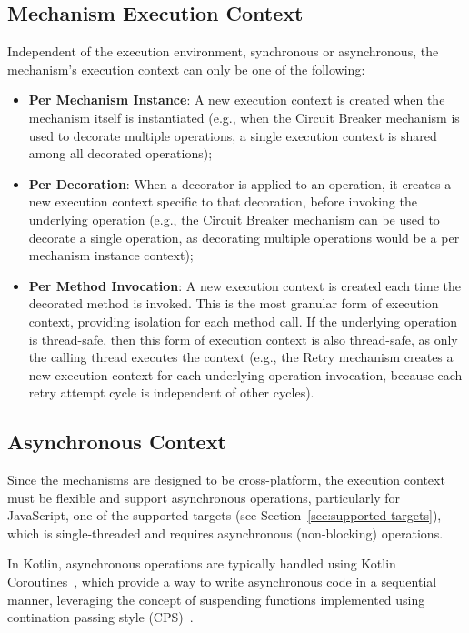 \subsection{Mechanism Execution Context}\label{subsec:mechanism-execution-context}

Independent of the execution environment, synchronous or asynchronous, the mechanism's execution context can only be one of the following:

\begin{itemize}
    \item \textbf{Per Mechanism Instance}: A new execution context is created when the mechanism itself is instantiated (e.g., when the Circuit Breaker mechanism is used to decorate multiple operations, a single execution context is shared among all decorated operations);
    \item \textbf{Per Decoration}: When a decorator is applied to an operation, it creates a new execution context specific to that decoration, before invoking the underlying operation (e.g., the Circuit Breaker mechanism can be used to decorate a single operation, as decorating multiple operations would be a per mechanism instance context);
    \item \textbf{Per Method Invocation}: A new execution context is created each time the decorated method is invoked.
    This is the most granular form of execution context, providing isolation for each method call.
    If the underlying operation is thread-safe, then this form of execution context is also thread-safe,
    as only the calling thread executes the context
    (e.g., the Retry mechanism creates a new execution context for each underlying operation invocation,
    because each retry attempt cycle is independent of other cycles).
\end{itemize}

\subsection{Asynchronous Context}\label{subsec:asynchronous-context}

Since the mechanisms are designed to be cross-platform, the execution context must be flexible and support asynchronous operations, particularly for JavaScript, one of the supported targets (see Section~\ref{sec:supported-targets}), which is single-threaded and requires asynchronous (non-blocking) operations.

In Kotlin, asynchronous operations are typically handled using Kotlin Coroutines~\cite{kotlin-coroutines},
which provide a way to write asynchronous code in a sequential manner,
leveraging the concept of suspending functions implemented using contination passing style (CPS)~\cite{continuation-passing-style}.

